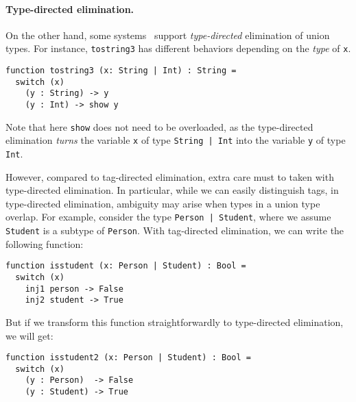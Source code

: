 \paragraph{Type-directed elimination.}

On the other hand, some
systems~\cite{castagna:settheoretic} support
\textit{type-directed} elimination of union types. For instance,
\lstinline{tostring3} has different behaviors depending on the \textit{type} of
\lstinline{x}.

\begin{lstlisting}
function tostring3 (x: String | Int) : String =
  switch (x)
    (y : String) -> y
    (y : Int) -> show y
\end{lstlisting}

\noindent Note that here \lstinline{show} does not need to be overloaded,
as the type-directed elimination
\textit{turns} the variable \lstinline{x} of type \lstinline{String | Int} into
the variable \lstinline{y} of type \lstinline{Int}.

However, compared to tag-directed elimination, extra care must to taken with
type-directed elimination. In particular, while we can easily distinguish tags,
in type-directed elimination, ambiguity may arise when types in a union type
overlap. For example, consider the type \lstinline{Person | Student}, where we
assume \lstinline{Student} is a subtype of \lstinline{Person}. With tag-directed
elimination, we can write the following function:

\begin{lstlisting}
function isstudent (x: Person | Student) : Bool =
  switch (x)
    inj1 person -> False
    inj2 student -> True
\end{lstlisting}

But if we transform this function straightforwardly to type-directed
elimination, we will get:

\begin{lstlisting}
function isstudent2 (x: Person | Student) : Bool =
  switch (x)
    (y : Person)  -> False
    (y : Student) -> True
\end{lstlisting}

